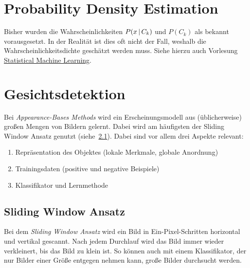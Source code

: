 	\section{Probability Density Estimation}
		Bisher wurden die Wahrscheinlichkeiten \( P(x \,\vert\, C_k) \) und \( P(C_k) \) als bekannt vorausgesetzt. In der Realität ist dies oft nicht der Fall, weshalb die Wahrscheinlichkeitsdichte geschätzt werden muss. Siehe hierzu auch Vorlesung \href{https://projects.frisp.org/documents/26}{Statistical Machine Learning}.

	\section{Gesichtsdetektion}
		Bei \emph{Appearance-Bases Methods} wird ein Erscheinungsmodell aus (üblicherweise) großen Mengen von Bildern gelernt. Dabei wird am häufigsten der Sliding Window Ansatz genutzt (siehe~\ref{sec:slidingwindow}). Dabei sind vor allem drei Aspekte relevant:
		\begin{enumerate}
			\item Repräsentation des Objektes (lokale Merkmale, globale Anordnung)
			\item Trainingsdaten (positive und negative Beispiele)
			\item Klassifikator und Lernmethode
		\end{enumerate}

		\subsection{Sliding Window Ansatz}
			\label{sec:slidingwindow}
			
			Bei dem \emph{Sliding Window Ansatz} wird ein Bild in Ein-Pixel-Schritten horizontal und vertikal gescannt. Nach jedem Durchlauf wird das Bild immer wieder verkleinert, bis das Bild zu klein ist. So können auch mit einem Klassifikator, der nur Bilder einer Größe entgegen nehmen kann, große Bilder durchsucht werden.

